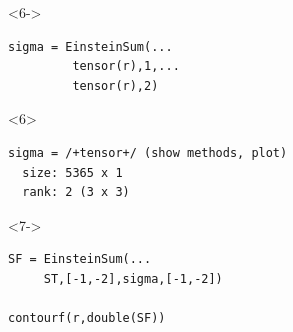 \documentclass[compress]{beamer}
\begin{document}
\begin{frame}[fragile]
\begin{overlayarea}{\textwidth}{7cm}
\begin{columns}
\begin{column}{7cm}
      \begin{onlyenv}<6->
        \begin{lstlisting}[style=input]
sigma = EinsteinSum(...
         tensor(r),1,...
         tensor(r),2)
       \end{lstlisting}
     \end{onlyenv}
      \begin{onlyenv}<6>
        \vspace{-0.3cm}
\begin{lstlisting}[style=output]
sigma = /+tensor+/ (show methods, plot)
  size: 5365 x 1
  rank: 2 (3 x 3)
\end{lstlisting}
\end{onlyenv}

      \begin{onlyenv}<7->
 \begin{lstlisting}[style=input]
SF = EinsteinSum(...
     ST,[-1,-2],sigma,[-1,-2])

contourf(r,double(SF))
\end{lstlisting}
\end{onlyenv}

    \end{column}
    \begin{column}{5cm}
    \end{column}
  \end{columns}


  \end{overlayarea}

\end{frame}



\end{document}
